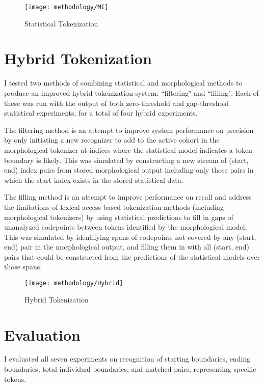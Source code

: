 \begin{figure}[ht!]
	\texttt{[image: methodology/MI]}
	\caption{Statistical Tokenization}
	\label{statdiagram}
\end{figure}

\section{Hybrid Tokenization}
I tested two methods of combining statistical and morphological methods to produce an improved hybrid tokenization system: ``filtering" and ``filling". Each of these was run with the output of both zero-threshold and gap-threshold statistical experiments, for a total of four hybrid experiments.

The filtering method is an attempt to improve system performance on precision by only initiating a new recognizer to add to the active cohort in the morphological tokenizer at indices where the statistical model indicates a token boundary is likely. This was simulated by constructing a new stream of (start, end) index pairs from stored morphological output including only those pairs in which the start index exists in the stored statistical data.

The filling method is an attempt to improve performance on recall and address the limitations of lexical-access based tokenization methods (including morphological tokenizers) by using statistical predictions to fill in gaps of unanalyzed codepoints between tokens identified by the morphological model. This was simulated by identifying spans of codepoints not covered by any (start, end) pair in the morphological output, and filling them in with all (start, end) pairs that could be constructed from the predictions of the statistical models over those spans.

\begin{figure}[ht!]
	\texttt{[image: methodology/Hybrid]}
	\caption{Hybrid Tokenization}
	\label{hybriddiagram}
\end{figure}

\section{Evaluation}
I evaluated all seven experiments on recognition of starting boundaries, ending boundaries, total individual boundaries, and matched pairs, representing specific tokens.

